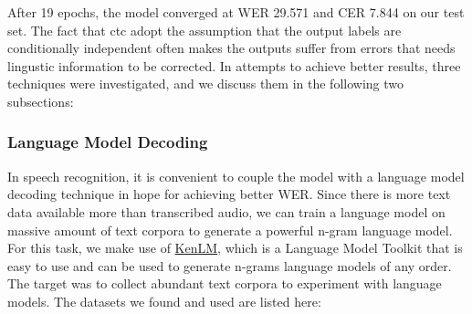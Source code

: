 After 19 epochs, the model converged at \ac{WER} 29.571 and \ac{CER} 7.844 on our test set.  The fact that ctc adopt the assumption that the output labels are conditionally independent often makes the outputs suffer from errors that needs lingustic information to be corrected. In attempts to achieve better results, three techniques were investigated, and we discuss them in the following two subsections:

\subsubsection{Language Model Decoding}

In speech recognition, it is convenient to couple the model with a language model decoding technique in hope for achieving better \ac{WER}. Since there is more text data available more than transcribed audio, we can train a language model on massive amount of text corpora to generate a powerful n-gram language model. For this task, we make use of \href{https://kheafield.com/code/kenlm/}{KenLM}, which is a Language Model Toolkit that is easy to use and can be used to generate n-grams language models of any order. The target was to collect abundant text corpora to experiment with language models. The datasets we found and used are listed here:

